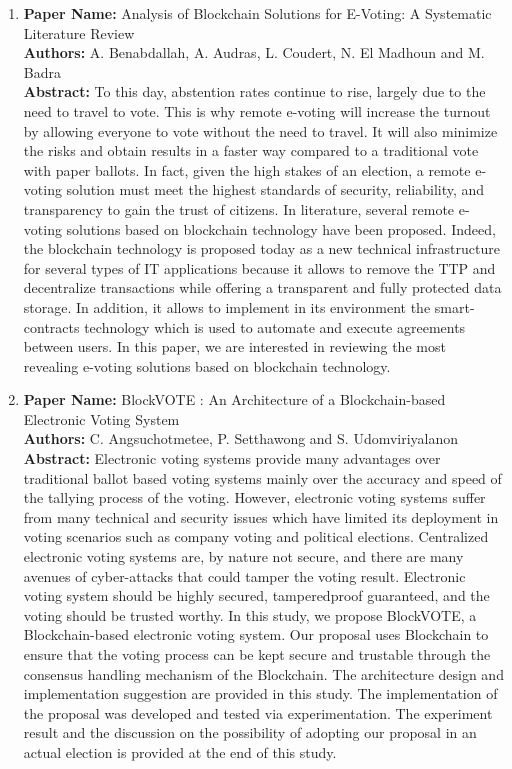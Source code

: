 \documentclass[journal,onecolumn]{IEEEtran}
\begin{document}
\begin{enumerate}
	\item
  	  \textbf{Paper Name:} Analysis of Blockchain Solutions for E-Voting: A Systematic Literature Review\\
	  \textbf{Authors:} A. Benabdallah, A. Audras, L. Coudert, N. El Madhoun and M. Badra\\
	  \textbf{Abstract:} To this day, abstention rates continue to rise, largely due to the need to travel to vote. This is why remote e-voting will increase the turnout by allowing everyone to vote without the need to travel. It will also minimize the risks and obtain results in a faster way compared to a traditional vote with paper ballots. In fact, given the high stakes of an election, a remote e-voting solution must meet the highest standards of security, reliability, and transparency to gain the trust of citizens. In literature, several remote e-voting solutions based on blockchain technology have been proposed. Indeed, the blockchain technology is proposed today as a new technical infrastructure for several types of IT applications because it allows to remove the TTP and decentralize transactions while offering a transparent and fully protected data storage. In addition, it allows to implement in its environment the smart-contracts technology which is used to automate and execute agreements between users. In this paper, we are interested in reviewing the most revealing e-voting solutions based on blockchain technology.
	\item
  	  \textbf{Paper Name:} BlockVOTE : An Architecture of a Blockchain-based Electronic Voting System\\
	  \textbf{Authors:} C. Angsuchotmetee, P. Setthawong and S. Udomviriyalanon\\
	  \textbf{Abstract:} Electronic voting systems provide many advantages over traditional ballot based voting systems mainly over the accuracy and speed of the tallying process of the voting. However, electronic voting systems suffer from many technical and security issues which have limited its deployment in voting scenarios such as company voting and political elections. Centralized electronic voting systems are, by nature not secure, and there are many avenues of cyber-attacks that could tamper the voting result. Electronic voting system should be highly secured, tamperedproof guaranteed, and the voting should be trusted worthy. In this study, we propose BlockVOTE, a Blockchain-based electronic voting system. Our proposal uses Blockchain to ensure that the voting process can be kept secure and trustable through the consensus handling mechanism of the Blockchain. The architecture design and implementation suggestion are provided in this study. The implementation of the proposal was developed and tested via experimentation. The experiment result and the discussion on the possibility of adopting our proposal in an actual election is provided at the end of this study.
  \end{enumerate}
\end{document}
